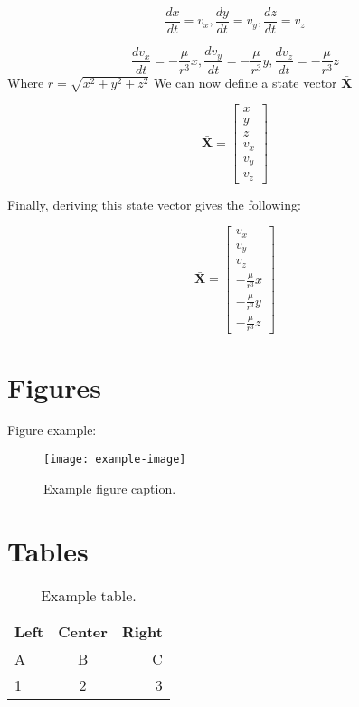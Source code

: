 \documentclass[a4paper, 12pt]{article}  %
\begin{document}
\begin{equation}
    \frac{dx}{dt} = v_{x},  \frac{dy}{dt} = v_{y},   \frac{dz}{dt} = v_{z}
\end{equation}


\begin{equation}
    \frac{dv_{x}}{dt} = -\frac{\mu}{r^3} x, \frac{dv_{y}}{dt} = -\frac{\mu}{r^3} y, \frac{dv_{z}}{dt} = -\frac{\mu}{r^3} z
\end{equation}
Where $r = \sqrt{x^{2} + y^{2} + z^{2}}$
\newline
We can now define a state vector $\mathbf{\bar{X}}$


\begin{equation}
    \mathbf{\bar{X}} = 
    \begin{bmatrix}
        x \\
        y \\
        z \\
        v_x \\
        v_y \\
        v_z
        \end{bmatrix}
\end{equation}

Finally, deriving this state vector gives the following:

\begin{equation}
    \mathbf{\dot{\bar{X}}} = 
    \begin{bmatrix}
        v_x \\
        v_y \\
        v_z \\
        -\frac{\mu}{r^3} x \\
        -\frac{\mu}{r^3} y \\
        -\frac{\mu}{r^3} z
        \end{bmatrix}
\end{equation}



\section{Figures}
Figure example:
\begin{figure}[H]
    \centering
    \texttt{[image: example-image]}
    \caption{Example figure caption.}
    \label{fig:example}
\end{figure}

\section{Tables}
\begin{table}[H]
    \centering
    \begin{tabular}{l c r}
        \toprule
        Left & Center & Right \\
        \midrule
        A & B & C \\
        1 & 2 & 3 \\
        \bottomrule
    \end{tabular}
    \caption{Example table.}
    \label{tab:example}
\end{table}
\end{document}
